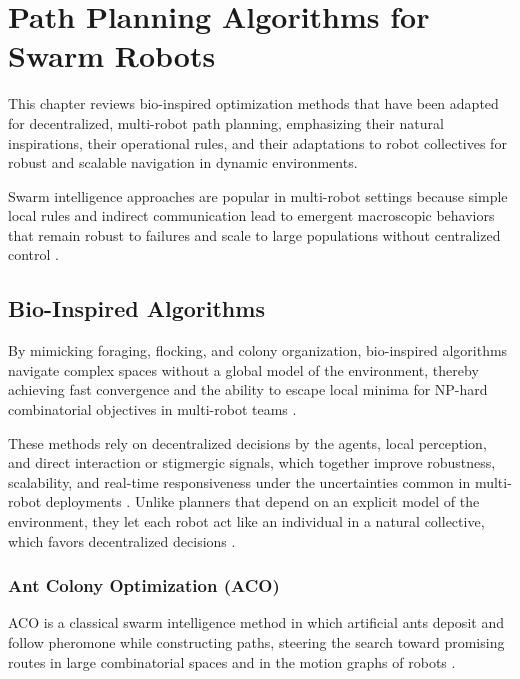 \chapter{Path Planning Algorithms for Swarm Robots}\label{chap:algorithms}

This chapter reviews bio-inspired optimization methods that have been adapted for
decentralized, multi-robot path planning, emphasizing their natural inspirations,
their operational rules, and their adaptations to robot collectives for robust
and scalable navigation in dynamic environments.

Swarm intelligence approaches are popular in multi-robot settings because simple
local rules and indirect communication lead to emergent macroscopic behaviors
that remain robust to failures and scale to large populations without
centralized control \cite{nguyen2024swarm}.

\section{Bio-Inspired Algorithms}\label{sec:bio-inspired}

By mimicking foraging, flocking, and colony organization, bio-inspired algorithms
navigate complex spaces without a global model of the environment, thereby
achieving fast convergence and the ability to escape local minima for NP-hard
combinatorial objectives in multi-robot teams \cite{lin2022review}.

These methods rely on decentralized decisions by the agents, local perception,
and direct interaction or stigmergic signals, which together improve robustness,
scalability, and real-time responsiveness under the uncertainties common in
multi-robot deployments \cite{nguyen2024swarm}. Unlike planners that depend on an
explicit model of the environment, they let each robot act like an individual in
a natural collective, which favors decentralized decisions \cite{chen2025survey}.

\subsection{Ant Colony Optimization (ACO)}

ACO is a classical swarm intelligence method in which artificial ants deposit and
follow pheromone while constructing paths, steering the search toward promising
routes in large combinatorial spaces and in the motion graphs of robots
\cite{panigrahi2011handbook}.

